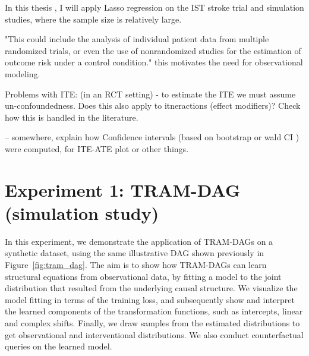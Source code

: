 In this thesis , I will apply Lasso regression on the IST stroke trial and simulation studies, where the sample size is relatively large.


 
 "This could include the analysis of individual patient data from multiple randomized trials, or even the use of nonrandomized studies for the estimation of outcome risk under a control condition." this motivates the need for observational modeling.


Problems with ITE: (in an RCT setting)
- to estimate the ITE we must assume un-confoundedness. Does this also apply to itneractions (effect modifiers)? Check how this is handled in the literature.



-- somewhere, explain how Confidence intervals (based on bootstrap or wald CI ) were computed, for ITE-ATE plot or other things.









\section{Experiment 1: TRAM-DAG (simulation study)} \label{sec:methods_experiment1}

In this experiment, we demonstrate the application of TRAM-DAGs on a synthetic dataset, using the same illustrative DAG shown previously in Figure~\ref{fig:tram_dag}. The aim is to show how TRAM-DAGs can learn structural equations from observational data, by fitting a model to the joint distribution that resulted from the underlying causal structure. We visualize the model fitting in terms of the training loss, and subsequently show and interpret the learned components of the transformation functions, such as intercepts, linear and complex shifts. Finally, we draw samples from the estimated distributions to get observational and interventional distributions. We also conduct counterfactual queries on the learned model.

